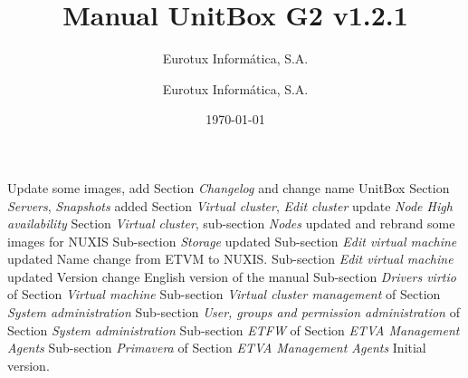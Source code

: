 \documentclass[12pt,a4paper,english]{scrreprt}
\author{Eurotux Informática, S.A.}
\title{Manual UnitBox G2 v1.2.1}
\subtitle{Eurotux Informática, S.A.}
\date{\today}
\begin{document}
\maketitle

\begin{Log}
Update some images, add Section \textit{Changelog} and change name UnitBox
Section \textit{Servers}, \textit{Snapshots} added
Section \textit{Virtual cluster}, \textit{Edit cluster} update \textit{Node High availability}
Section \textit{Virtual cluster}, sub-section \textit{Nodes} updated and rebrand some images for NUXIS
Sub-section \textit{Storage} updated 
Sub-section \textit{Edit virtual machine} updated 
Name change from ETVM to NUXIS. Sub-section \textit{Edit virtual machine} updated 
Version change
English version of the manual
Sub-section \textit{Drivers virtio} of Section \textit{Virtual machine}
Sub-section \textit{Virtual cluster management} of Section \textit{System administration}
Sub-section \textit{User, groups and permission administration} of Section \textit{System administration}
Sub-section \textit{ETFW} of Section \textit{ETVA Management Agents}
Sub-section \textit{Primavera} of Section \textit{ETVA Management Agents}
Initial version.
\end{Log}

\tableofcontents

\listoffigures


%
%




\end{document}
